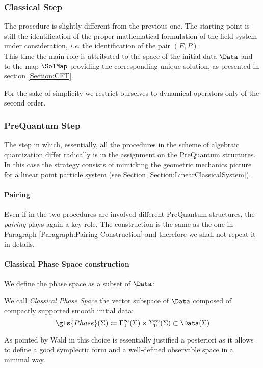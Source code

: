 \documentclass[Main]{subfiles}
\begin{document}
	\subsubsection{Classical Step}
		The procedure is slightly different from the previous one.
		The starting point is still the identification of the  proper mathematical formulation of  the field system under consideration, \textit{i.e.} the identification of the pair $(E,P)$.
		\\
		This time the main role is attributed to the space of the initial data $\Data$ and to the map $\SolMap$ providing the corresponding unique solution, as presented in section \ref{Section:CFT}.

		\begin{NB}

				For the sake of simplicity we restrict ourselves to dynamical operators only of the second order.
		\end{NB}

	\subsubsection{PreQuantum Step}
		The step in which, essentially, all the procedures in the scheme of algebraic quantization differ radically is in the assignment on the PreQuantum structures.
		In this case the strategy consists of mimicking the geometric mechanics picture for a linear point particle system (see Section \ref{Section:LinearClassicalSystem}).

		\paragraph{Pairing}
		Even if in the two procedures are involved different PreQuantum structures, the \emph{pairing} plays again a key role.
		The construction is the same as the one in Paragraph \ref{Paragraph:Pairing Construction} and therefore we shall not repeat it in details.

		\paragraph{Classical Phase Space construction}
			We define the phase space as a subset of $\Data$:
			\begin{definition}
				We call \emph{Classical Phase Space} the vector subspace of $\Data$ composed of compactly supported smooth initial data:
				\begin{displaymath}
					\gls{Phase}(\Sigma) \coloneqq \Gamma_0^\infty(\Sigma) \times \Sigma_0^\infty (\Sigma) \subset \Data(\Sigma)
				\end{displaymath}
			\end{definition}
			As pointed by Wald in \cite{Wald1994} this choice is essentially justified a posteriori as it allows to define a good symplectic form and a well-defined observable space in a minimal way.
\end{document}
